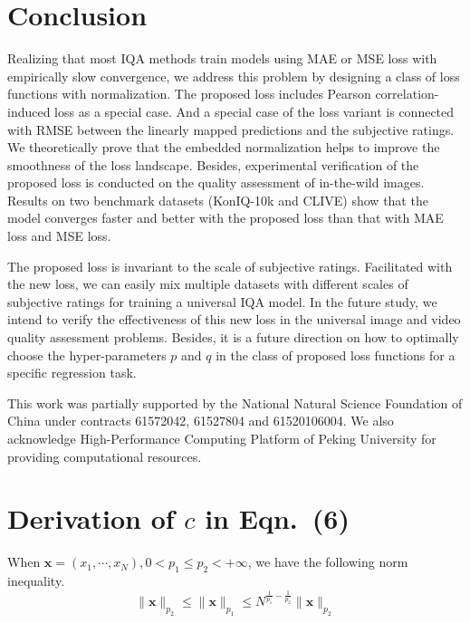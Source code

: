\documentclass[sigconf]{acmart}
\begin{document}
\section{Conclusion}
\label{sec:conclusion}
Realizing that most IQA methods train models using MAE or MSE loss with empirically slow convergence, we address this problem by designing a class of loss functions with normalization.
The proposed loss includes Pearson correlation-induced loss as a special case.
And a special case of the loss variant is connected with RMSE between the linearly mapped predictions and the subjective ratings.
We theoretically prove that the embedded normalization helps to improve the smoothness of the loss landscape.
Besides, experimental verification of the proposed loss is conducted on the quality assessment of in-the-wild images.
Results on two benchmark datasets (KonIQ-10k and CLIVE) show that the model converges faster and better with the proposed loss than that with MAE loss and MSE loss.

The proposed loss is invariant to the scale of subjective ratings.
Facilitated with the new loss, we can easily mix multiple datasets with different scales of subjective ratings for training a universal IQA model.
In the future study, we intend to verify the effectiveness of this new loss in the universal image and video quality assessment problems.
Besides, it is a future direction on how to optimally choose the hyper-parameters $p$ and $q$ in the class of proposed loss functions for a specific regression task.

\begin{acks}
This work was partially supported by the National Natural Science Foundation of China under contracts 61572042, 61527804 and 61520106004. We also acknowledge High-Performance Computing Platform of Peking University for providing computational resources.
\end{acks}




\appendix


\section{Derivation of $c$ in Eqn.~(6)}
\label{sec:supp_a}
\begin{lemma}
When $\mathbf{x}=(x_1,\cdots,x_N), 0< p_1\le p_2<+\infty$, we have the following norm inequality.
\begin{equation}
\|{\mathbf{x}}\|_{p_2}\le\|{\mathbf{x}}\|_{p_1}\le N^{\frac{1}{p_1}-\frac{1}{p_2}}\|{\mathbf{x}}\|_{p_2}
\end{equation}
\end{lemma}
\end{document}
